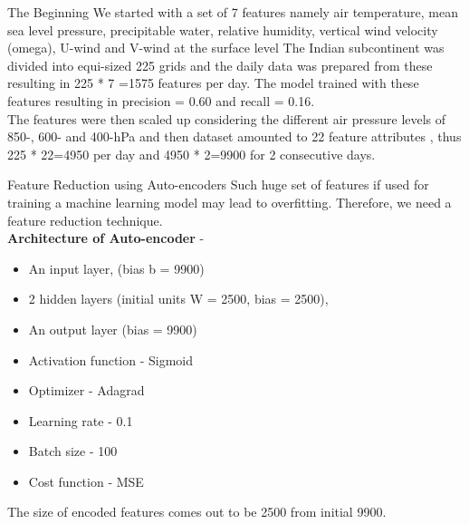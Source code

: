 \documentclass[11pt]{beamer}
\begin{document}
\begin{frame}{The Beginning}
We started with a set of 7 features namely air temperature, mean sea level pressure, precipitable water, relative humidity, vertical wind velocity (omega), U-wind and V-wind at the surface level  The Indian subcontinent was divided into equi-sized 225 grids and the daily data was prepared from these resulting in 225 * 7 =1575 features per day. The model trained with these features 
resulting in precision = 0.60 and recall = 0.16. \\

The features were then scaled up considering the different air pressure levels of  850-, 600- and 400-hPa and then dataset amounted to 22 feature attributes , thus 225 * 22=4950 per day and 4950 * 2=9900 for 2 consecutive days.
\end{frame}

\begin{frame}{Feature Reduction using Auto-encoders}
Such huge set of features if used for training a machine learning model may lead to overfitting. Therefore, we need a feature reduction technique.\\

\textbf{Architecture of Auto-encoder} -
\begin{itemize}
\item An input layer, (bias b = 9900)
\item 2 hidden layers (initial units W = 2500, bias = 2500),
\item An output layer (bias = 9900)
\item Activation function - Sigmoid
\item Optimizer - Adagrad
\item Learning rate - 0.1
\item Batch size - 100
\item Cost function - MSE
\end{itemize}
The size of encoded features comes out to be 2500 from initial 9900.

\end{frame}
\end{document}

